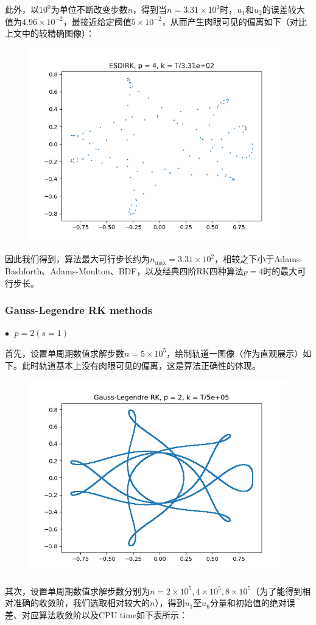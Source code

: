 \documentclass{ctexart}
\begin{document}
\begin{sloppypar}
此外，以$10^0$为单位不断改变步数$n$，得到当$n = 3.31 \times 10^2$时，$u_1$和$u_2$的误差较大值为$4.96 \times 10^{-2}$，最接近给定阈值$5 \times 10^{-2}$，从而产生肉眼可见的偏离如下（对比上文中的较精确图像）：
\begin{figure}[H]
\centering
\includegraphics[scale = 0.45]{./report_src/Figure_67.png}
\end{figure}
因此我们得到，算法最大可行步长约为$n_{\max} = 3.31 \times 10^2$，相较之下小于Adams-Bashforth、Adams-Moulton、BDF，以及经典四阶RK四种算法$p=4$时的最大可行步长。

\subsubsection{Gauss-Legendre RK methods}
$\bullet \;$ $p = 2(s=1)$

首先，设置单周期数值求解步数$n = 5 \times 10^5$，绘制轨道一图像（作为直观展示）如下。此时轨道基本上没有肉眼可见的偏离，这是算法正确性的体现。
\begin{figure}[H]
\centering
\includegraphics[scale = 0.45]{./report_src/Figure_68.png}
\end{figure}
其次，设置单周期数值求解步数分别为$n = 2 \times 10^5,4 \times 10^5,8 \times 10^5$（为了能得到相对准确的收敛阶，我们选取相对较大的$n$），得到$u_1$至$u_6$分量和初始值的绝对误差、对应算法收敛阶以及CPU time如下表所示：


\end{sloppypar}
\end{document}
